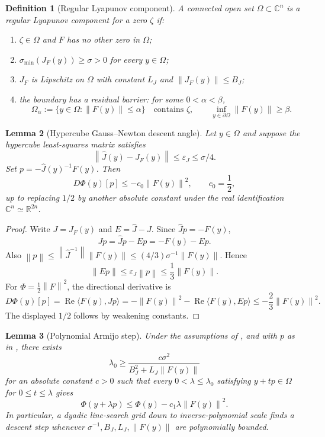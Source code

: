 \documentclass[11pt]{article}
\newtheorem{definition}{Definition}[section]
\newtheorem{lemma}[definition]{Lemma}
\newcommand{\C}{\mathbb C}
\newcommand{\R}{\mathbb R}
\newcommand{\eps}{\varepsilon}
\newcommand{\norm}[1]{\left\lVert #1\right\rVert}
\begin{document}
\begin{definition}[Regular Lyapunov component]\label{def:regular-lyapunov-component}
A connected open set $\Omega\subset\C^n$ is a regular Lyapunov component for a zero $\zeta$ if:
\begin{enumerate}[label=(\roman*)]
\item $\zeta\in\Omega$ and $F$ has no other zero in $\Omega$;
\item $\sigma_{\min}(J_F(y))\ge\sigma>0$ for every $y\in\Omega$;
\item $J_F$ is Lipschitz on $\Omega$ with constant $L_J$ and $\norm{J_F(y)}\le B_J$;
\item the boundary has a residual barrier: for some $0<\alpha<\beta$,
\[
        \Omega_\alpha:=\{y\in\Omega:\norm{F(y)}\le\alpha\}
        \quad\text{contains }\zeta,
        \qquad
        \inf_{y\in\partial\Omega}\norm{F(y)}\ge\beta.
\]
\end{enumerate}
\end{definition}

\begin{lemma}[Hypercube Gauss--Newton descent angle]\label{lem:gn-descent-angle}
Let $y\in\Omega$ and suppose the hypercube least-squares matrix satisfies
\[
        \norm{\widehat J(y)-J_F(y)}\le\eps_J\le\sigma/4.
\]
Set $p=-\widehat J(y)^{-1}F(y)$.  Then
\[
        D\Phi(y)[p]
        \le -c_0\norm{F(y)}^2,
        \qquad c_0=\frac12,
\]
up to replacing $1/2$ by another absolute constant under the real identification $\C^n\simeq\R^{2n}$.
\end{lemma}

\begin{proof}
Write $J=J_F(y)$ and $E=\widehat J-J$.  Since $\widehat Jp=-F(y)$,
\[
        Jp=\widehat Jp-Ep=-F(y)-Ep.
\]
Also $\norm{p}\le\norm{\widehat J^{-1}}\norm{F(y)}\le (4/3)\sigma^{-1}\norm{F(y)}$.  Hence
\[
        \norm{Ep}\le \eps_J\norm p\le \frac13\norm{F(y)}.
\]
For $\Phi=\frac12\norm F^2$, the directional derivative is
\[
        D\Phi(y)[p]=\operatorname{Re}\langle F(y),Jp\rangle
        =-\norm{F(y)}^2-\operatorname{Re}\langle F(y),Ep\rangle
        \le -\frac23\norm{F(y)}^2.
\]
The displayed $1/2$ follows by weakening constants.
\end{proof}

\begin{lemma}[Polynomial Armijo step]\label{lem:armijo}
Under the assumptions of , and with $p$ as in , there exists
\[
        \lambda_0\ge \frac{c\sigma^2}{B_J^2+L_J\norm{F(y)}}
\]
for an absolute constant $c>0$ such that every $0<\lambda\le\lambda_0$ satisfying $y+t p\in\Omega$ for $0\le t\le\lambda$ gives
\[
        \Phi(y+\lambda p)
        \le \Phi(y)-c_1\lambda\norm{F(y)}^2.
\]
In particular, a dyadic line-search grid down to inverse-polynomial scale finds a descent step whenever $\sigma^{-1},B_J,L_J,\norm{F(y)}$ are polynomially bounded.
\end{lemma}
\end{document}
